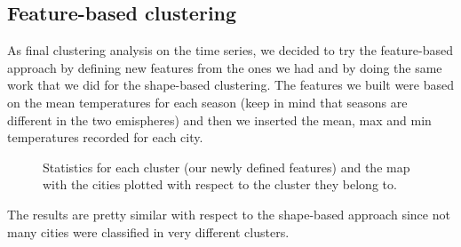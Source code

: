 \subsection{Feature-based clustering}
As final clustering analysis on the time series, we decided to try the feature-based approach by defining new features from the ones we had and by doing the same work that we did for the shape-based clustering. The features we built were based on the mean temperatures for each season (keep in mind that seasons are different in the two emispheres) and then we inserted the mean, max and min temperatures recorded for each city.
\begin{figure}[H]
    \centering
    \caption{Statistics for each cluster (our newly defined features) and the map with the cities plotted with respect to the cluster they belong to.}
    \label{fig:timeseries_fbc_plot_map}
\end{figure}
The results are pretty similar with respect to the shape-based approach since not many cities were classified in very different clusters.
